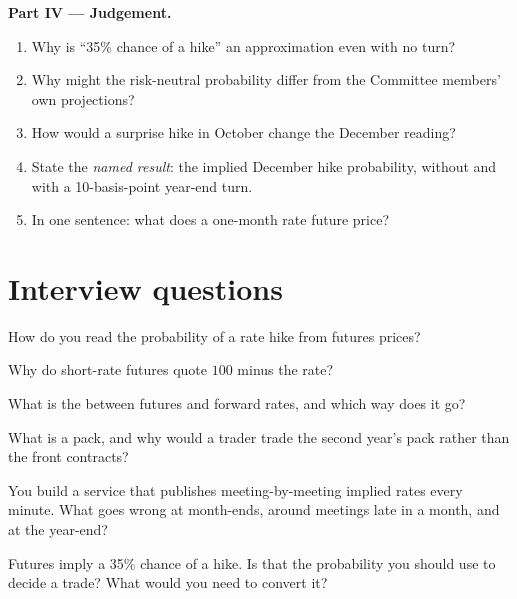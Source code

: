 \begin{problem}
\medskip\noindent\textbf{Part IV --- Judgement.}
\begin{enumerate}[resume]
\item Why is ``35\% chance of a hike'' an approximation even with no turn?
\item Why might the risk-neutral probability differ from the Committee members'
own projections?
\item How would a surprise hike in October change the December reading?
\item State the \emph{named result}: the implied December hike probability,
without and with a 10-basis-point year-end turn.
\item In one sentence: what does a one-month rate future price?
\end{enumerate}
\end{problem}

\section{Interview questions}

\begin{interviewq}\label{iq:m2:short-term-interest-rate-futures:1}
How do you read the probability of a rate hike from futures prices?
\end{interviewq}

\begin{interviewq}\label{iq:m2:short-term-interest-rate-futures:2}
Why do short-rate futures quote $100$ minus the rate?
\end{interviewq}

\begin{interviewq}\label{iq:m2:short-term-interest-rate-futures:3}
What is the  between futures and forward rates, and which
way does it go?
\end{interviewq}

\begin{interviewq}\label{iq:m2:short-term-interest-rate-futures:4}
What is a pack, and why would a trader trade the second year's pack rather
than the front contracts?
\end{interviewq}

\begin{interviewq}\label{iq:m2:short-term-interest-rate-futures:5}
You build a service that publishes meeting-by-meeting implied rates every
minute. What goes wrong at month-ends, around meetings late in a month, and at
the year-end?
\end{interviewq}

\begin{interviewq}\label{iq:m2:short-term-interest-rate-futures:6}
Futures imply a 35\% chance of a hike. Is that the probability you should use
to decide a trade? What would you need to convert it?
\end{interviewq}
